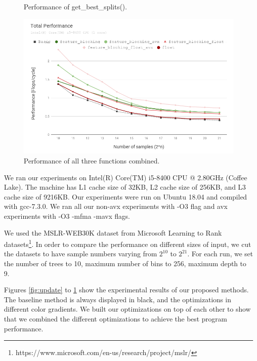 \begin{figure}[t!]
\begin{minipage}{.45\textwidth}
      \caption{Performance of get\_best\_splits().}
      \includegraphics[width=1.0\textwidth]{fig/total.png}
      \caption{Performance of all three functions combined.}
        \label{fig:all}
  \end{minipage}
\end{figure}
 
 We ran our experiments on Intel(R) Core(TM) i5-8400 CPU @ 2.80GHz (Coffee Lake). The machine has L1 cache size of 32KB, L2 cache size of 256KB, and L3 cache size of 9216KB. Our experiments were run on Ubuntu 18.04 and compiled with gcc-7.3.0. We ran all our non-avx experiments with -O3 flag and avx experiments with -O3 -mfma -mavx flags.

We used the MSLR-WEB30K dataset from Microsoft Learning to Rank datasets\footnote{https://www.microsoft.com/en-us/research/project/mslr/}.
In order to compare the performance on different sizes of input, we cut the datasets to have sample numbers varying from $2^{10}$ to $2^{21}$. For each run, we set the number of trees to 10, maximum number of bins to 256, maximum depth to 9.


Figures \ref{fig:update} to \ref{fig:all} show the experimental results of our proposed methods. The baseline method is always displayed in black, and the optimizations in different color gradients. We built our optimizations on top of each other to show that we combined the different optimizations to achieve the best program performance.

